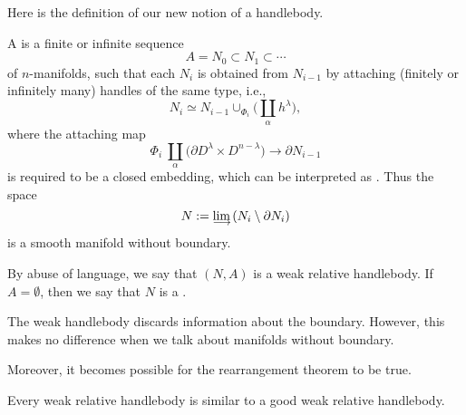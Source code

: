 Here is the definition of our new notion of a handlebody.

\begin{definition}
    A  is a finite or infinite sequence 
    \[ A=N_0\subset N_1\subset\cdots \]
    of $n$-manifolds,
    such that each $N_i$ is obtained from $N_{i-1}$ by attaching
    (finitely or infinitely many) handles of the same type, i.e.,
    \[ N_i \simeq N_{i-1} \cup_{\Phi_i} \biggl(\coprod_\alpha h^\lambda\biggr), \]
    where the attaching map
    \[ \Phi_i \: \coprod_\alpha {} \bigl( \partial D^\lambda\times D^{n-\lambda} \bigr) \to \partial N_{i-1} \]
    is required to be a closed embedding,
    which can be interpreted as .
    Thus the space 
    \[ N:=\limdct{}(N_i\setminus\partial N_i) \]
    is a smooth manifold without boundary. \varqed
\end{definition}

By abuse of language, we say that $(N,A)$ is a weak relative handlebody.
If $A=\emptyset$, then we say that $N$ is a .

The weak handlebody discards information about the boundary.
However, this makes no difference when we talk about manifolds without boundary.

Moreover, it becomes possible for the 
rearrangement theorem to be true.

\begin{theorem}[Rearrangement] \label{thm-rearrange-weak}
Every weak relative handlebody
is similar to a good weak relative handlebody.
\end{theorem}

